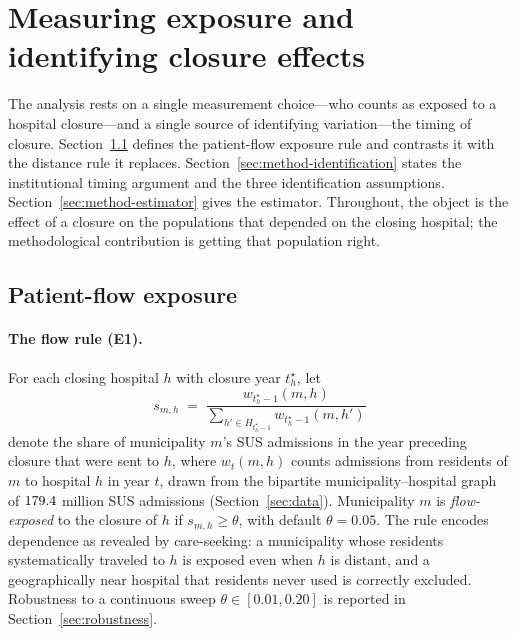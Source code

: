 \section{Measuring exposure and identifying closure effects}
\label{sec:method}

The analysis rests on a single measurement choice---who counts as
exposed to a hospital closure---and a single source of identifying
variation---the timing of closure. Section~\ref{sec:method-exposure}
defines the patient-flow exposure rule and contrasts it with the
distance rule it replaces. Section~\ref{sec:method-identification}
states the institutional timing argument and the three identification assumptions.
Section~\ref{sec:method-estimator} gives the estimator. Throughout, the
object is the effect of a closure on the populations that depended on
the closing hospital; the methodological contribution is getting that
population right.

\subsection{Patient-flow exposure}
\label{sec:method-exposure}

\paragraph{The flow rule (E1).} For each closing hospital $h$ with
closure year $t_h^{\star}$, let
\begin{equation}
  s_{m, h} \;=\;
  \frac{w_{t_h^{\star} - 1}(m, h)}{\sum_{h' \in H_{t_h^{\star} - 1}}
  w_{t_h^{\star} - 1}(m, h')}
  \label{eq:share}
\end{equation}
denote the share of municipality $m$'s SUS admissions in the year
preceding closure that were sent to $h$, where $w_t(m,h)$ counts
admissions from residents of $m$ to hospital $h$ in year $t$, drawn from
the bipartite municipality--hospital graph of $179.4$ million SUS
admissions (Section~\ref{sec:data}). Municipality $m$ is
\emph{flow-exposed} to the closure of $h$ if $s_{m,h} \geq \theta$, with
default $\theta = 0.05$. The rule encodes dependence as revealed by
care-seeking: a municipality whose residents systematically traveled to
$h$ is exposed even when $h$ is distant, and a geographically near
hospital that residents never used is correctly excluded. Robustness to
a continuous sweep $\theta \in [0.01, 0.20]$ is reported in
Section~\ref{sec:robustness}.

